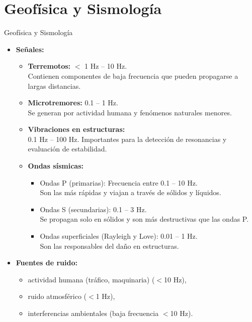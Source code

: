 \documentclass{beamer}
\numberwithin{section}{part}
\begin{document}
\section{Geofísica y Sismología}
\begin{frame}{Geofísica y Sismología}
    \begin{itemize}
        \item \textbf{Señales:}
        \begin{itemize}\scriptsize
            \item \textbf{Terremotos:} $<$ 1 Hz – 10 Hz.\\Contienen componentes de baja frecuencia que pueden propagarse a largas distancias.
            \item \textbf{Microtremores:} 0.1 – 1 Hz.\\Se generan por actividad humana y fenómenos naturales menores.
            \item \textbf{Vibraciones en estructuras:}\\0.1 Hz – 100 Hz. Importantes para la detección de resonancias y evaluación de estabilidad.
            \item \textbf{Ondas sísmicas:}
            \begin{itemize}\scriptsize
                \item Ondas P (primarias): Frecuencia entre 0.1 – 10 Hz.\\Son las más rápidas y viajan a través de sólidos y líquidos.
                \item Ondas S (secundarias): 0.1 – 3 Hz.\\Se propagan solo en sólidos y son más destructivas que las ondas P.
                \item Ondas superficiales (Rayleigh y Love): 0.01 – 1 Hz.\\Son las responsables del daño en estructuras.
            \end{itemize}
        \end{itemize}
        \item \textbf{Fuentes de ruido:} 
        \begin{itemize}\scriptsize
            \item actividad humana (tráfico, maquinaria) ($<$10 Hz),
            \item ruido atmosférico ($<$1 Hz),
            \item interferencias ambientales (baja frecuencia $<$10 Hz).
        \end{itemize}
    \end{itemize}
\end{frame}
\end{document}
